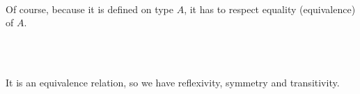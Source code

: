\begin{code}
%
\\
\>[0]\<[9]%
\>[9] \AgdaSymbol{:}   \AgdaSymbol{:}   \AgdaSymbol{\}}\<%
\\
\>[9]\<[19]%
\>[19]\AgdaSymbol{(} \AgdaSymbol{:} \AgdaFunction{[}  \AgdaFunction{]}   \AgdaSymbol{)}\<%
\\
\>[9]\<[19]%
\>[19]\AgdaSymbol{(}  \AgdaSymbol{:}  \AgdaFunction{[}  \AgdaFunction{]fm}  \AgdaSymbol{)} \<%
\\
\>[9]\<[19]%
\>[19]   \AgdaSymbol{)}  \<[32]%
\>[32]\<%
\\
\>[9]\<[19]%
\>[19]  \AgdaSymbol{(}\AgdaFunction{[}  \AgdaFunction{]subst}  \AgdaSymbol{)} \AgdaSymbol{(}\AgdaFunction{[}  \AgdaFunction{]subst}  \AgdaSymbol{))}\<%
\\
\end{code}

Of course, because it is defined on type $A$, it has to respect equality (equivalence) of $A$.

\begin{code}
%
\\
\>[0]\<[9]%
\>[9] \AgdaSymbol{:}  \AgdaSymbol{\{}  \AgdaSymbol{\}}  \AgdaFunction{[} \AgdaFunction{[}  \AgdaFunction{]fm}  \AgdaFunction{]}   \AgdaSymbol{)}     \AgdaSymbol{)}\<%
\\
\end{code}

It is an equivalence relation, so we have reflexivity, symmetry and transitivity.

